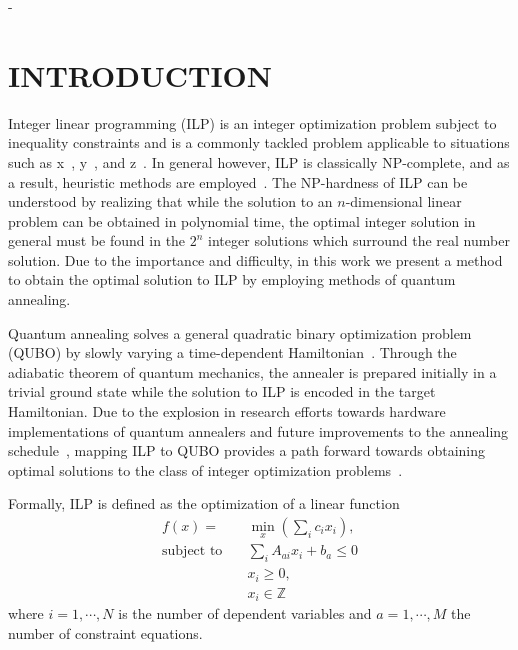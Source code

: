 -\documentclass[prd,twocolumn,tightenlines,preprintnumbers,showpacs,superscriptaddress,notitlepage,nofootinbib,eqsecnum,floatfix,longbibliography]{revtex4}
\begin{document}

\maketitle
\tableofcontents

\flushbottom
\maketitle

\section{INTRODUCTION}
\label{sec:introduction}

Integer linear programming (ILP) is an integer optimization problem subject to inequality constraints and is a commonly tackled problem applicable to situations such as x~\cite{}, y~\cite{}, and z~\cite{}.
In general however, ILP is classically NP-complete, and as a result, heuristic methods are employed~\cite{}.
The NP-hardness of ILP can be understood by realizing that while the solution to an $n$-dimensional linear problem can be obtained in polynomial time, the optimal integer solution in general must be found in the $2^n$ integer solutions which surround the real number solution.
Due to the importance and difficulty, in this work we present a method to obtain the optimal solution to ILP by employing methods of quantum annealing.

Quantum annealing solves a general quadratic binary optimization problem (QUBO) by slowly varying a time-dependent Hamiltonian~\cite{}.
Through the adiabatic theorem of quantum mechanics, the annealer is prepared initially in a trivial ground state while the solution to ILP is encoded in the target Hamiltonian.
Due to the explosion in research efforts towards hardware implementations of quantum annealers and future improvements to the annealing schedule~\cite{}, mapping ILP to QUBO provides a path forward towards obtaining optimal solutions to the class of integer optimization problems~\cite{2018Glover}.

Formally, ILP is defined as the optimization of a linear function
{\color{blue}
\begin{align}
    f(x) = &\min\limits_{x}(\sum_i c_i x_i),\\
    \textrm{subject to} \quad & \sum_i A_{ai}x_i +b_a \leq 0 \\
    & x_i \geq 0,\\
    & x_i \in \mathbb{Z}
\end{align}
}
where $i=1, \cdots,  N$ is the number of dependent variables and $a=1, \cdots, M$ the number of constraint equations.
\end{document}
